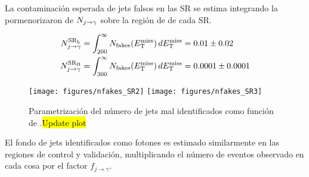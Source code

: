La contaminación esperada de jets falsos en las SR se estima integrando la
pormenorizaron de $N_{j\rightarrow\gamma}$ sobre la región de {\met} de cada SR.

\begin{align}
  N_{j\rightarrow\gamma}^\text{\ensuremath{\mathrm{SR}_\mathrm{L}}} &= \int_{200}^{\infty} N_\text{fakes}(E_{\mathrm{T}}^{\mathrm{miss}}) \, dE_{\mathrm{T}}^{\mathrm{miss}} = 0.01 \pm 0.02 \\
  N_{j\rightarrow\gamma}^\text{\ensuremath{\mathrm{SR}_\mathrm{H}}} &= \int_{300}^{\infty} N_\text{fakes}(E_{\mathrm{T}}^{\mathrm{miss}}) \, dE_{\mathrm{T}}^{\mathrm{miss}} = 0.0001 \pm 0.0001
\end{align}


\begin{figure}[h]
  \centering
  \texttt{[image: figures/nfakes\_SR2]}  \hfill
  \texttt{[image: figures/nfakes\_SR3]}
  \caption{Parametrización del número de jets mal identificados como
    función de {\met}.\hl{Update plot}}
  \label{fig:jetfake_nfakes_met}
\end{figure}

El fondo de jets identificados como fotones es estimado similarmente en las
regiones de control y validación,
multiplicando el número de eventos observado en cada cosa por el factor
$f_{j\to\gamma}$.









